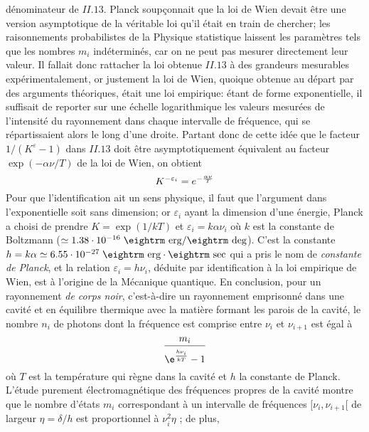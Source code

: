 d\'enominateur de $II.13$. Planck soup\c connait que la loi de Wien devait 
\^etre une version asymptotique de la v\'eritable loi qu'il \'etait en train 
de chercher; les raisonnements probabilistes de la Physique statistique 
laissent les param\`etres tels  que les nombres $m_i$ ind\'etermin\'es, 
car on ne  peut pas mesurer directement leur valeur. Il fallait donc 
rattacher la loi obtenue $II.13$  \`a des grandeurs mesurables 
exp\'erimentalement, or justement la loi de Wien, quoique obtenue au 
d\'epart par des arguments th\'eoriques, \'etait une loi empirique: \'etant 
de forme exponentielle, il suffisait de reporter sur une \'echelle 
logarithmique les valeurs  mesur\'ees de l'intensit\'e du rayonnement dans 
chaque intervalle de fr\'equence, qui se r\'epartissaient alors le long d'une 
droite.  Partant donc de cette id\'ee que le facteur $1 / (K^\varepsilon - 
1)$ dans $II.13$ doit \^etre asymptotiquement \'equivalent au facteur 
$\exp (-\alpha\nu / T)$ de la loi de Wien, on obtient  
$$K^{-\varepsilon_i} = e^{-{\alpha\nu 
\over T}}$$  
Pour que l'identification ait un sens physique, il faut que 
l'argument  dans l'exponentielle soit sans dimension; or  $\varepsilon_i$ 
ayant la dimension d'une \'energie, Planck a choisi de prendre $K = \exp (1 
/ kT)$  et $\varepsilon_i = k\alpha\nu_i$ o\`u $k$  est la constante de 
Boltzmann ($\simeq 1.38 \cdot 10^{-16}\;  \hbox{\eightrm 
erg}/\hbox{\eightrm deg}$). C'est la constante $h = k\alpha \simeq 6.55 
\cdot 10^{-27}\; \hbox{\eightrm erg} \cdot \hbox{\eightrm sec}$ qui a  
pris le nom  de  {\it constante  de Planck}, et la relation $\varepsilon_i = 
h\nu_i$, d\'eduite par identification \`a la loi empirique de Wien, est \`a 
l'origine de la M\'ecanique quantique.  
\medskip 
En conclusion, pour un rayonnement {\it de corps noir}, c'est-\`a-dire  
un rayonnement emprisonn\'e dans une cavit\'e et en \'equilibre  
thermique avec la mati\`ere formant les parois de la cavit\'e, le  
nombre $n_i$  de photons dont la fr\'equence est comprise entre 
$\nu_i$ et $\nu_{i+1}$ est \'egal \`a  
$${m_i \over \vrule height15pt width0pt \e^{{h\nu_i\vrule depth2.2pt width0pt 
\over \vrule height4.5pt width0pt kT}} - 1}$$ 
o\`u $T$ est la temp\'erature qui r\`egne dans la cavit\'e et $h$ la 
constante de Planck. L'\'etude purement \'electromagn\'etique des 
fr\'equences propres de la cavit\'e montre que le nombre d'\'etats $m_i$ 
correspondant \`a un intervalle  de fr\'equences $[\nu_i,  \nu_{i+1}[$ de 
largeur $\eta = \delta  / h$ est proportionnel \`a  $\nu_i^2 \eta$ ; de plus,  
